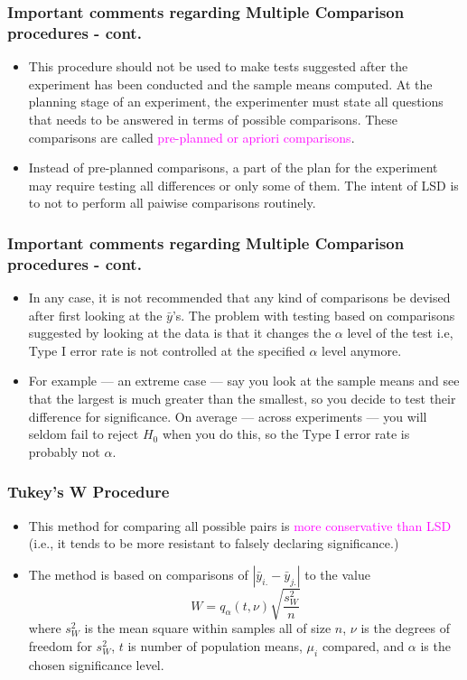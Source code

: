 \documentclass[xcolor=dvipsnames,12pt]{beamer}
\begin{document}
\begin{frame}
\frametitle{Important comments regarding Multiple Comparison procedures - cont.}
\begin{itemize}
\item This procedure should not be used to make tests suggested after
the experiment has been conducted and the sample means computed.
At the planning stage of an experiment, the experimenter must
state all questions that needs to  be answered in terms of
possible comparisons. These comparisons are called 
{\textcolor{magenta}{pre-planned or apriori comparisons}}. 
\item Instead of pre-planned
comparisons, a part of the plan for the experiment may require 
testing all differences or only some of them.  The intent of LSD is to 
not to perform all  paiwise comparisons routinely.
\end{itemize}
\end{frame}



\begin{frame}
\frametitle{Important comments regarding Multiple Comparison procedures - cont.}
\begin{itemize}
\item In any case, it is not recommended that any kind of comparisons 
be devised after first looking at the $\bar{y}$'s.
The problem with testing based on comparisons suggested by looking
at the data is that it changes the $\alpha$ level of the test i.e,
Type I error rate is not controlled at the specified  $\alpha$
level anymore.
\item For example --- an extreme case --- say you look at the sample
means and see that the largest is much greater than the smallest,
so you decide to test their difference for significance.  On
average --- across experiments --- you will seldom fail to
reject $H_0$ when you do this, so the Type I error rate is
probably not $\alpha$.
\end{itemize}
\end{frame}


\begin{frame}
\frametitle{Tukey's W Procedure} 
\begin{itemize}
\item This method for comparing all possible pairs is {\textcolor{magenta}{more conservative
than LSD}} (i.e., it tends to be more resistant to falsely declaring
significance.)
\item The method is based on comparisons of
$|\bar{y}_{i.} - \bar{y}_{j.}|$ to the value
$$
  W = q_\alpha(t,\nu) \sqrt{\frac{s_W^2}{n}}
$$
where $s_W^2$ is the mean square within samples all of size $n$,
$\nu$  is the degrees of freedom for $s_W^2$, $t$ is number of
population means, $\mu_i$ compared, and $\alpha$ is the chosen 
significance level.
\end{itemize}
\end{frame}
\end{document}
